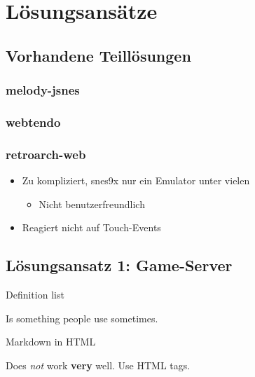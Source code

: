 \chapter{Lösungsansätze}\label{luxf6sungsansuxe4tze}

\blindtext[1]

\section{Vorhandene Teillösungen}\label{vorhandene-teilluxf6sungen}

\subsection{melody-jsnes}\label{melody-jsnes}

\blindtext[1]

\subsection{webtendo}\label{webtendo}

\blindtext[1]

\subsection{retroarch-web}\label{retroarch-web}

\begin{itemize}
\tightlist
\item
  Zu kompliziert, snes9x nur ein Emulator unter vielen

  \begin{itemize}
  \tightlist
  \item
    Nicht benutzerfreundlich
  \end{itemize}
\item
  Reagiert nicht auf Touch-Events
\end{itemize}

\blindtext[1]

\section{Lösungsansatz 1:
Game-Server}\label{luxf6sungsansatz-1-game-server}

Definition list

Is something people use sometimes.

Markdown in HTML

Does \emph{not} work \textbf{very} well. Use HTML tags.

